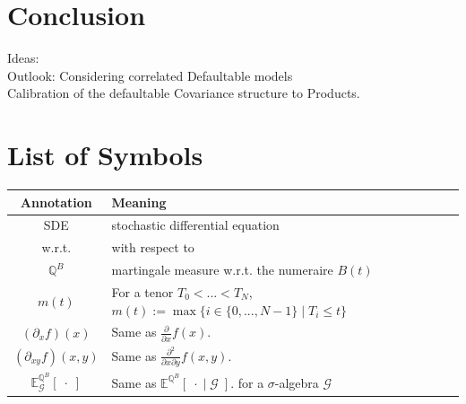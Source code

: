 \documentclass[12pt]{article}
\begin{document}
	\pagebreak
	\section{Conclusion}
	Ideas:\\
	Outlook: Considering correlated Defaultable models\\
	Calibration of the defaultable Covariance structure to Products.
	
	
	
	\pagebreak
	\section{List of Symbols}
	\begin{tabular}{cl}
		
		Annotation & Meaning \\
		\hline
		SDE & stochastic differential equation \\
		w.r.t. & with respect to \\
		$\mathbb{Q}^B$ & martingale measure w.r.t. the numeraire $B(t)$\\
		$m(t)$ & For a tenor $T_0 < ... < T_N$, $m(t):= \max\{i \in \{0, ..., N-1\} \; | \; T_i \le t \}$\\
		$(\partial_{x}f)(x)$ & Same as $\frac{\partial}{\partial x}f(x)$.\\
		$(\partial_{x y}f)(x, y)$ & Same as $\frac{\partial^2}{\partial x \partial y}f(x, y)$.\\
		$\mathbb{E}^{\mathbb{Q}^B}_{\mathcal{G}}\left[ \; \cdot \; \right]$ & Same as
		$\mathbb{E}^{\mathbb{Q}^B}\left[ \; \cdot \; | \; \mathcal{G} \; \right].$ for a $\sigma$-algebra $\mathcal{G}$\\
		
	\end{tabular}
	\pagebreak
		
		
		
		
		
		
	\newpage
	\thispagestyle{empty}
	\clearpage
	
\end{document}
